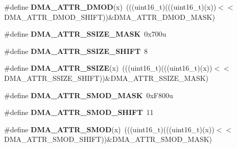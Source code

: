 \begin{DoxyCompactItemize}
\item 
\#define {\bfseries D\+M\+A\+\_\+\+A\+T\+T\+R\+\_\+\+D\+M\+OD}(x)~(((uint16\+\_\+t)(((uint16\+\_\+t)(x))$<$$<$D\+M\+A\+\_\+\+A\+T\+T\+R\+\_\+\+D\+M\+O\+D\+\_\+\+S\+H\+I\+FT))\&D\+M\+A\+\_\+\+A\+T\+T\+R\+\_\+\+D\+M\+O\+D\+\_\+\+M\+A\+SK)\hypertarget{group__DMA__Register__Masks_ga817a104659b44c38da980ccf0ca4f594}{}\label{group__DMA__Register__Masks_ga817a104659b44c38da980ccf0ca4f594}

\item 
\#define {\bfseries D\+M\+A\+\_\+\+A\+T\+T\+R\+\_\+\+S\+S\+I\+Z\+E\+\_\+\+M\+A\+SK}~0x700u\hypertarget{group__DMA__Register__Masks_ga30f2f09fb581b8c9619414125cf3045b}{}\label{group__DMA__Register__Masks_ga30f2f09fb581b8c9619414125cf3045b}

\item 
\#define {\bfseries D\+M\+A\+\_\+\+A\+T\+T\+R\+\_\+\+S\+S\+I\+Z\+E\+\_\+\+S\+H\+I\+FT}~8\hypertarget{group__DMA__Register__Masks_ga815c285ac74667a99f2a7ce5e686641b}{}\label{group__DMA__Register__Masks_ga815c285ac74667a99f2a7ce5e686641b}

\item 
\#define {\bfseries D\+M\+A\+\_\+\+A\+T\+T\+R\+\_\+\+S\+S\+I\+ZE}(x)~(((uint16\+\_\+t)(((uint16\+\_\+t)(x))$<$$<$D\+M\+A\+\_\+\+A\+T\+T\+R\+\_\+\+S\+S\+I\+Z\+E\+\_\+\+S\+H\+I\+FT))\&D\+M\+A\+\_\+\+A\+T\+T\+R\+\_\+\+S\+S\+I\+Z\+E\+\_\+\+M\+A\+SK)\hypertarget{group__DMA__Register__Masks_gab86855f2aff624b11942ebf79dbcb1b6}{}\label{group__DMA__Register__Masks_gab86855f2aff624b11942ebf79dbcb1b6}

\item 
\#define {\bfseries D\+M\+A\+\_\+\+A\+T\+T\+R\+\_\+\+S\+M\+O\+D\+\_\+\+M\+A\+SK}~0x\+F800u\hypertarget{group__DMA__Register__Masks_ga288d7e465abd4be34477ae308a9b0982}{}\label{group__DMA__Register__Masks_ga288d7e465abd4be34477ae308a9b0982}

\item 
\#define {\bfseries D\+M\+A\+\_\+\+A\+T\+T\+R\+\_\+\+S\+M\+O\+D\+\_\+\+S\+H\+I\+FT}~11\hypertarget{group__DMA__Register__Masks_gaebf723df7b7cad164714583c0876a378}{}\label{group__DMA__Register__Masks_gaebf723df7b7cad164714583c0876a378}

\item 
\#define {\bfseries D\+M\+A\+\_\+\+A\+T\+T\+R\+\_\+\+S\+M\+OD}(x)~(((uint16\+\_\+t)(((uint16\+\_\+t)(x))$<$$<$D\+M\+A\+\_\+\+A\+T\+T\+R\+\_\+\+S\+M\+O\+D\+\_\+\+S\+H\+I\+FT))\&D\+M\+A\+\_\+\+A\+T\+T\+R\+\_\+\+S\+M\+O\+D\+\_\+\+M\+A\+SK)\hypertarget{group__DMA__Register__Masks_ga820fb5655da874e3672c8608b18ecfc9}{}\label{group__DMA__Register__Masks_ga820fb5655da874e3672c8608b18ecfc9}


\end{DoxyCompactItemize}
